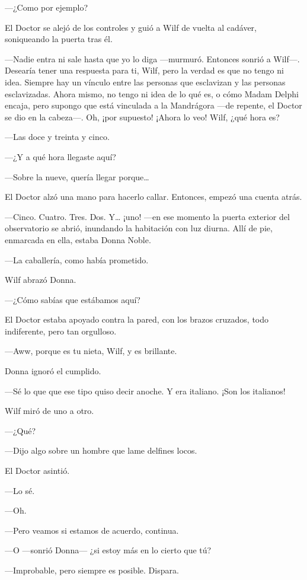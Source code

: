 ---¿Como por ejemplo?

El Doctor se alejó de los controles y guió a Wilf de vuelta al cadáver,
soniqueando la puerta tras él.

---Nadie entra ni sale hasta que yo lo diga ---murmuró. Entonces sonrió
a Wilf---. Desearía tener una respuesta para ti, Wilf, pero la verdad es
que no tengo ni idea. Siempre hay un vínculo entre las personas que
esclavizan y las personas esclavizadas. Ahora mismo, no tengo ni idea de
lo qué es, o cómo Madam Delphi encaja, pero supongo que está vinculada a
la Mandrágora ---de repente, el Doctor se dio en la cabeza---. Oh, ¡por
supuesto! ¡Ahora lo veo! Wilf, ¿qué hora es?

---Las doce y treinta y cinco.

---¿Y a qué hora llegaste aquí?

---Sobre la nueve, quería llegar porque\ldots{}

El Doctor alzó una mano para hacerlo callar. Entonces, empezó una cuenta
atrás.

---Cinco. Cuatro. Tres. Dos. Y\ldots{} ¡uno! ---en ese momento la puerta
exterior del observatorio se abrió, inundando la habitación con luz
diurna. Allí de pie, enmarcada en ella, estaba Donna Noble.

---La caballería, como había prometido.

Wilf abrazó Donna.

---¿Cómo sabías que estábamos aquí?

El Doctor estaba apoyado contra la pared, con los brazos cruzados, todo
indiferente, pero tan orgulloso.

---Aww, porque es tu nieta, Wilf, y es brillante.

Donna ignoró el cumplido.

---Sé lo que que ese tipo quiso decir anoche. Y era italiano. ¡Son los
italianos!

Wilf miró de uno a otro.

---¿Qué?

---Dijo algo sobre un hombre que lame delfines locos.

El Doctor asintió.

---Lo sé.

---Oh.

---Pero veamos si estamos de acuerdo, continua.

---O ---sonrió Donna--- ¿si estoy más en lo cierto que tú?

---Improbable, pero siempre es posible. Dispara.

